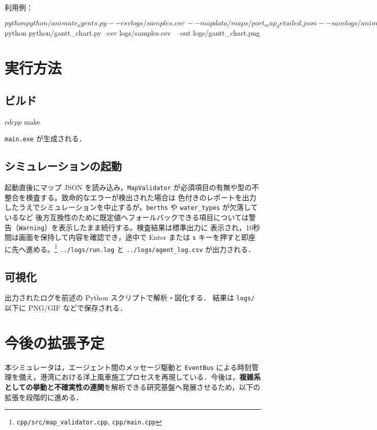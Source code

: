 \documentclass[10pt,letterpaper]{jsarticle}
\begin{document}
利用例：
\begin{cmdcode}
$ python python/animate_agents.py --csv logs/samples.csv \
    --map data/maps/port_map_detailed.json --save logs/anim.gif

$ python python/gantt_chart.py --csv logs/samples.csv \
    --out logs/gantt_chart.png
\end{cmdcode}

\section{実行方法}
\subsection{ビルド}
\begin{cmdcode}
$ cd cpp
$ make
\end{cmdcode}
\texttt{main.exe} が生成される．

\subsection{シミュレーションの起動}
起動直後にマップ JSON を読み込み，\texttt{MapValidator} が必須項目の有無や型の不整合を検査する。致命的なエラーが検出された場合は
色付きのレポートを出力したうえでシミュレーションを中止するが，\texttt{berths} や \texttt{water\_types} が欠落しているなど
後方互換性のために既定値へフォールバックできる項目については警告（\texttt{Warning}）を表示したまま続行する。検査結果は標準出力に
表示され，10秒間は画面を保持して内容を確認でき，途中で Enter または \texttt{s} キーを押すと即座に先へ進める。\footnote{\texttt{cpp/src/map\_validator.cpp}, \texttt{cpp/main.cpp}}
\texttt{../logs/run.log} と \texttt{../logs/agent\_log.csv} が出力される．

\subsection{可視化}
出力されたログを前述の Python スクリプトで解析・図化する．
結果は \texttt{logs/} 以下に PNG/GIF などで保存される．

\section{今後の拡張予定}
本シミュレータは，エージェント間のメッセージ駆動と \texttt{EventBus} による時刻管理を備え，港湾における洋上風車施工プロセスを再現している．今後は，\textbf{複雑系としての挙動と不確実性の連関}を解析できる研究基盤へ発展させるため，以下の拡張を段階的に進める．
\end{document}
